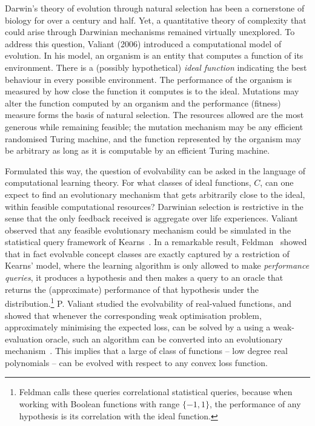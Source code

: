 Darwin's theory of evolution through natural selection has been a cornerstone of
biology for over a century and half. Yet, a quantitative theory of complexity
that could arise through Darwinian mechanisms remained virtually unexplored.  To
address this question, Valiant (2006) introduced a computational model of
evolution. In his model, an organism is an entity that computes a function of
its environment.  There is a (possibly hypothetical) \emph{ideal function}
indicating the best behaviour in every possible environment. The performance of
the organism is measured by how close the function it computes is to the ideal.
Mutations may alter the function computed by an organism and the performance
(fitness) measure forms the basis of natural selection. The resources allowed
are the most generous while remaining feasible; the mutation mechanism may be
any efficient randomised Turing machine, and the function represented by the
organism may be arbitrary as long as it is computable by an efficient Turing
machine.

Formulated this way, the question of evolvability can be asked in the language
of computational learning theory. For what classes of ideal functions, $C$, can
one expect to find an evolutionary mechanism that gets arbitrarily close to the
ideal, within feasible computational resources? Darwinian selection is
restrictive in the sense that the only feedback received is aggregate over life
experiences. Valiant observed that any feasible evolutionary mechanism could be
simulated in the statistical query framework of Kearns~\cite{Kearns:1998}. In a
remarkable result, Feldman~\cite{Feldman:2008-evolvability} showed that in fact
evolvable concept classes are exactly captured by a restriction of Kearns'
model, where the learning algorithm is only allowed to make \emph{performance
queries}, \ie it produces a hypothesis and then makes a query to an oracle that
returns the (approximate) performance of that hypothesis under the
distribution.\footnote{Feldman calls these queries correlational statistical
queries, because when working with Boolean functions with range $\{-1, 1\}$, the
performance of any hypothesis is its correlation with the ideal function.} P.
Valiant studied the evolvability of real-valued functions, and showed that
whenever the corresponding weak optimisation problem, \ie approximately
minimising the expected loss, can be solved by a using a weak-evaluation oracle,
such an algorithm can be converted into an evolutionary
mechanism~\cite{Valiant:2012-real}. This implies that a large of class of
functions -- low degree real polynomials -- can be evolved with respect to any
convex loss function.

